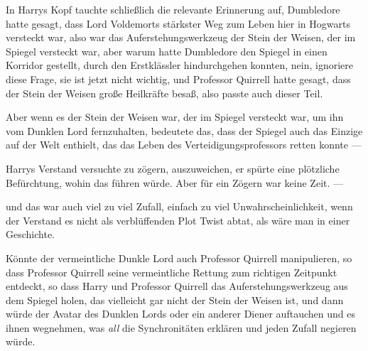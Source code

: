 In Harrys Kopf tauchte schließlich die relevante Erinnerung auf, Dumbledore hatte gesagt, dass Lord Voldemorts stärkster Weg zum Leben hier in Hogwarts versteckt war, also war das Auferstehungswerkzeug der Stein der Weisen, der im Spiegel versteckt war, aber warum hatte Dumbledore den Spiegel in einen Korridor gestellt, durch den Erstklässler hindurchgehen konnten, nein, ignoriere diese Frage, sie ist jetzt nicht wichtig, und Professor Quirrell hatte gesagt, dass der Stein der Weisen große Heilkräfte besaß, also passte auch dieser Teil.

Aber wenn es der Stein der Weisen war, der im Spiegel versteckt war, um ihn vom Dunklen Lord fernzuhalten, bedeutete das, dass der Spiegel auch das Einzige auf der Welt enthielt, das das Leben des Verteidigungsprofessors retten konnte —

Harrys Verstand versuchte zu zögern, auszuweichen, er spürte eine plötzliche Befürchtung, wohin das führen würde. Aber für ein Zögern war keine Zeit. —

und das war auch viel zu viel Zufall, einfach zu viel Unwahrscheinlichkeit, wenn der Verstand es nicht als verblüffenden Plot Twist abtat, als wäre man in einer Geschichte.

Könnte der vermeintliche Dunkle Lord auch Professor Quirrell manipulieren, so dass Professor Quirrell seine vermeintliche Rettung zum richtigen Zeitpunkt entdeckt, so dass Harry und Professor Quirrell das Auferstehungswerkzeug aus dem Spiegel holen, das vielleicht gar nicht der Stein der Weisen ist, und dann würde der Avatar des Dunklen Lords oder ein anderer Diener auftauchen und es ihnen wegnehmen, was \emph{all} die Synchronitäten erklären und jeden Zufall negieren würde.

